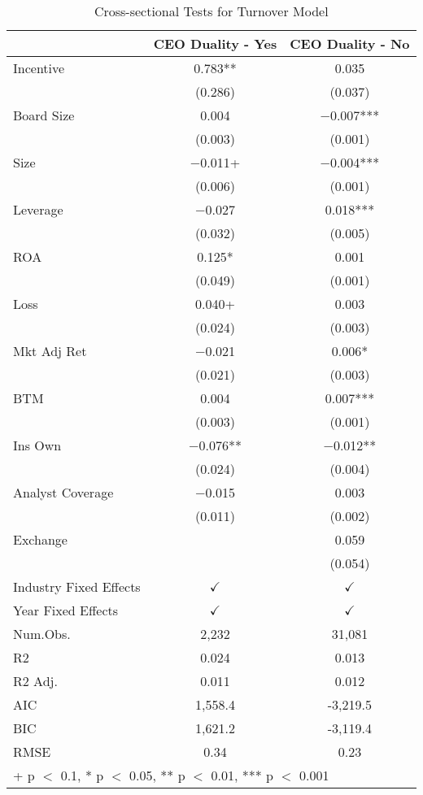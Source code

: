 \documentclass[12pt,english]{article}
\begin{document}
\begin{table}
\caption{Cross-sectional Tests for Turnover Model}
\label{tab:cs}
\centering
\begin{tabular}[t]{lcc}
\toprule
  & CEO Duality - Yes & CEO Duality - No\\
\midrule
Incentive & \num{0.783}** & \num{0.035}\\
 & (\num{0.286}) & (\num{0.037})\\
Board Size & \num{0.004} & \num{-0.007}***\\
 & (\num{0.003}) & \vphantom{1} (\num{0.001})\\
Size & \num{-0.011}+ & \num{-0.004}***\\
 & (\num{0.006}) & (\num{0.001})\\
Leverage & \num{-0.027} & \num{0.018}***\\
 & (\num{0.032}) & (\num{0.005})\\
ROA & \num{0.125}* & \num{0.001}\\
 & (\num{0.049}) & (\num{0.001})\\
Loss & \num{0.040}+ & \num{0.003}\\
 & (\num{0.024}) & (\num{0.003})\\
Mkt Adj Ret & \num{-0.021} & \num{0.006}*\\
 & (\num{0.021}) & (\num{0.003})\\
BTM & \num{0.004} & \num{0.007}***\\
 & (\num{0.003}) & (\num{0.001})\\
Ins Own & \num{-0.076}** & \num{-0.012}**\\
 & (\num{0.024}) & (\num{0.004})\\
Analyst Coverage & \num{-0.015} & \num{0.003}\\
 & (\num{0.011}) & (\num{0.002})\\
Exchange &  & \num{0.059}\\
 &  & (\num{0.054})\\
Industry Fixed Effects  & $\checkmark$    & $\checkmark$\\
Year Fixed Effects      & $\checkmark$    & $\checkmark$\\
\midrule
Num.Obs. & 2,232 & 31,081\\
R2 & \num{0.024} & \num{0.013}\\
R2 Adj. & \num{0.011} & \num{0.012}\\
AIC & 1,558.4 & -3,219.5\\
BIC & 1,621.2 & -3,119.4\\
RMSE & \num{0.34} & \num{0.23}\\
\bottomrule
\multicolumn{3}{l}{\rule{0pt}{1em}+ p $<$ 0.1, * p $<$ 0.05, ** p $<$ 0.01, *** p $<$ 0.001}\\
\end{tabular}
\end{table}
\end{document}
